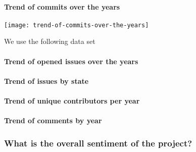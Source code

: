 \paragraph{Trend of commits over the years}
\begin{center}
    \texttt{[image: trend-of-commits-over-the-years]}    
\end{center}
We use the following data set 
\paragraph{Trend of opened issues over the years}
\paragraph{Trend of issues by state}
\paragraph{Trend of unique contributors per year}
\paragraph{Trend of comments by year}


\subsubsection{What is the overall sentiment of the project?}
